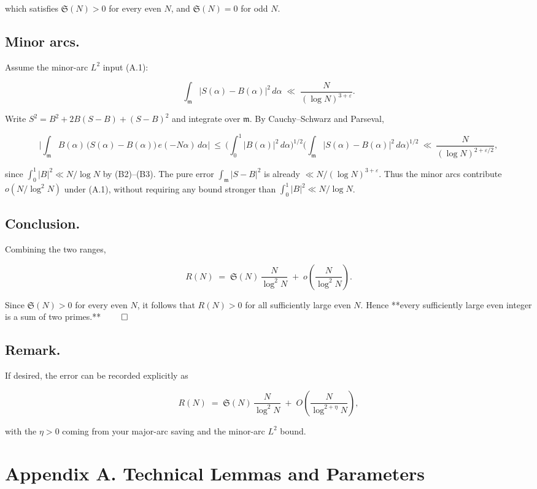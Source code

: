 \documentclass[11pt]{article}
\theoremstyle{definition}
\theoremstyle{remark}
\begin{document}
which satisfies $\mathfrak S(N)>0$ for every even $N$, and $\mathfrak S(N)=0$ for odd $N$.

\subsection*{Minor arcs.}

Assume the minor-arc $L^2$ input (A.1):

$$
\int_{\mathfrak m} |S(\alpha)-B(\alpha)|^2\,d\alpha
\;\ll\;\frac{N}{(\log N)^{3+\varepsilon}}.
$$

Write $S^2=B^2+2B(S-B)+(S-B)^2$ and integrate over $\mathfrak m$.
By Cauchy–Schwarz and Parseval,

$$
\Big|\int_{\mathfrak m} B(\alpha)\,\big(S(\alpha)-B(\alpha)\big)\,e(-N\alpha)\,d\alpha\Big|
\ \le\ \Big(\int_0^1 |B(\alpha)|^2\,d\alpha\Big)^{1/2}
\Big(\int_{\mathfrak m}|S(\alpha)-B(\alpha)|^2\,d\alpha\Big)^{1/2}
\ \ll\ \frac{N}{(\log N)^{2+\varepsilon/2}},
$$

since $\int_0^1|B|^2\ll N/\log N$ by (B2)–(B3). The pure error $\int_{\mathfrak m}|S-B|^2$ is already $\ll N/(\log N)^{3+\varepsilon}$. Thus the minor arcs contribute $o\!\left(N/\log^2 N\right)$ under (A.1), without requiring any bound stronger than $\int_0^1|B|^2\ll N/\log N$.

\subsection*{Conclusion.}

Combining the two ranges,

$$
R(N)
\;=\;\mathfrak S(N)\,\frac{N}{\log^2 N}\;+\;o\!\left(\frac{N}{\log^2 N}\right).
$$

Since $\mathfrak S(N)>0$ for every even $N$, it follows that $R(N)>0$ for all sufficiently large even $N$. Hence **every sufficiently large even integer is a sum of two primes.** $\qed$

\subsection*{Remark.} 
If desired, the error can be recorded explicitly as

$$
R(N)\;=\;\mathfrak S(N)\,\frac{N}{\log^2 N}\;+\;O\!\left(\frac{N}{\log^{2+\eta}N}\right),
$$

with the $\eta>0$ coming from your major-arc saving and the minor-arc $L^2$ bound.

\section*{Appendix A. Technical Lemmas and Parameters}
\end{document}
